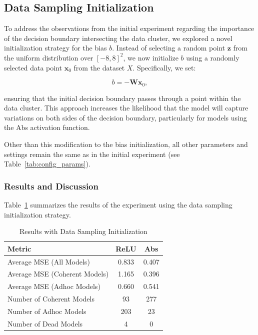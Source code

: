 \subsection{Data Sampling Initialization}

To address the observations from the initial experiment regarding the importance of the decision boundary intersecting the data cluster, we explored a novel initialization strategy for the bias $b$. Instead of selecting a random point $\mathbf{z}$ from the uniform distribution over $[-8, 8]^2$, we now initialize $b$ using a randomly selected data point $\mathbf{x}_0$ from the dataset $X$. Specifically, we set:

\begin{equation}
b = -\mathbf{W} \mathbf{x}_0,
\end{equation}

ensuring that the initial decision boundary passes through a point within the data cluster. This approach increases the likelihood that the model will capture variations on both sides of the decision boundary, particularly for models using the Abs activation function.

Other than this modification to the bias initialization, all other parameters and settings remain the same as in the initial experiment (see Table~\ref{tab:config_params}).

\subsubsection{Results and Discussion}

Table~\ref{tab:data_init_results} summarizes the results of the experiment using the data sampling initialization strategy.

\begin{table}[h]
    \centering
    \caption{Results with Data Sampling Initialization}
    \label{tab:data_init_results}
    \begin{tabular}{|l|c|c|}
    \hline
    Metric & ReLU & Abs \\
    \hline
    Average MSE (All Models) & 0.833 & 0.407 \\
    Average MSE (Coherent Models) & 1.165 & 0.396 \\
    Average MSE (Adhoc Models) & 0.660 & 0.541 \\
    Number of Coherent Models & 93 & 277 \\
    Number of Adhoc Models & 203 & 23 \\
    Number of Dead Models & 4 & 0 \\
    \hline
    \end{tabular}
\end{table}

